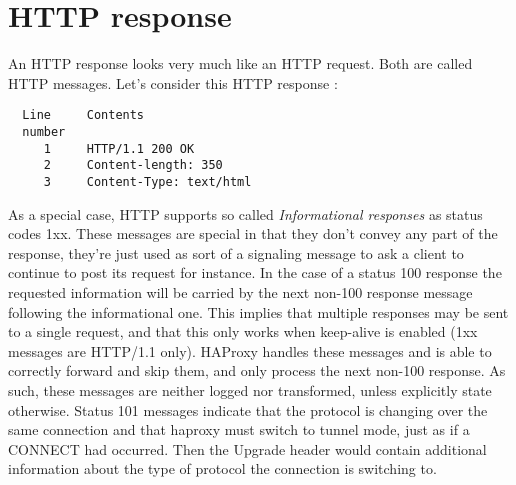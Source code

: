 
\section{HTTP response}

An HTTP response looks very much like an HTTP request. Both are called HTTP
messages. Let's consider this HTTP response :

\begin{verbatim}
  Line     Contents
  number
     1     HTTP/1.1 200 OK
     2     Content-length: 350
     3     Content-Type: text/html
\end{verbatim}


As a special case, HTTP supports so called \emph{Informational responses} as status
codes 1xx. These messages are special in that they don't convey any part of the
response, they're just used as sort of a signaling message to ask a client to
continue to post its request for instance. In the case of a status 100 response
the requested information will be carried by the next non-100 response message
following the informational one. This implies that multiple responses may be
sent to a single request, and that this only works when keep-alive is enabled
(1xx messages are HTTP/1.1 only). HAProxy handles these messages and is able to
correctly forward and skip them, and only process the next non-100 response. As
such, these messages are neither logged nor transformed, unless explicitly
state otherwise. Status 101 messages indicate that the protocol is changing
over the same connection and that haproxy must switch to tunnel mode, just as
if a CONNECT had occurred. Then the Upgrade header would contain additional
information about the type of protocol the connection is switching to.

